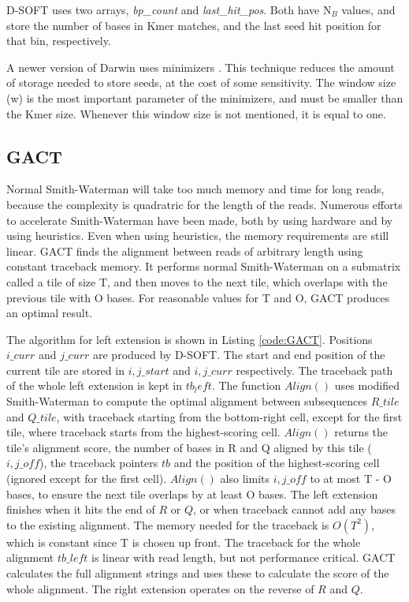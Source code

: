 \documentclass[../main/thesis.tex]{subfiles}
\begin{document}
D-SOFT uses two arrays, \textit{bp\_count} and \textit{last\_hit\_pos}.
Both have N$_{B}$ values, and store the number of bases in Kmer matches, and the last seed hit position for that bin, respectively.

A newer version of Darwin uses minimizers \cite{minimizers}.
This technique reduces the amount of storage needed to store seeds, at the cost of some sensitivity.
The window size (w) is the most important parameter of the minimizers, and must be smaller than the Kmer size.
Whenever this window size is not mentioned, it is equal to one.

\subsection{GACT}
Normal Smith-Waterman will take too much memory and time for long reads, because the complexity is quadratric for the length of the reads.
Numerous efforts to accelerate Smith-Waterman have been made, both by using hardware and by using heuristics.
Even when using heuristics, the memory requirements are still linear.
GACT finds the alignment between reads of arbitrary length using constant traceback memory.
It performs normal Smith-Waterman on a submatrix called a tile of size T, and then moves to the next tile, which overlaps with the previous tile with O bases.
For reasonable values for T and O, GACT produces an optimal result.

The algorithm for left extension is shown in Listing \ref{code:GACT}.
Positions $i\_curr$ and $j\_curr$ are produced by D-SOFT.
The start and end position of the current tile are stored in $i,j\_start$ and $i,j\_curr$ respectively.
The traceback path of the whole left extension is kept in $tb_left$.
The function $Align()$ uses modified Smith-Waterman to compute the optimal alignment between subsequences $R\_tile$ and $Q\_tile$, with traceback starting from the bottom-right cell, except for the first tile, where traceback starts from the highest-scoring cell.
$Align()$ returns the tile's alignment score, the number of bases in R and Q aligned by this tile ($i,j\_off$), the traceback pointers $tb$ and the position of the highest-scoring cell (ignored except for the first cell).
$Align()$ also limits $i,j\_off$ to at most T - O bases, to ensure the next tile overlaps by at least O bases.
The left extension finishes when it hits the end of $R$ or $Q$, or when traceback cannot add any bases to the existing alignment.
The memory needed for the traceback is $O(T^2)$, which is constant since T is chosen up front.
The traceback for the whole alignment $tb\_left$ is linear with read length, but not performance critical.
GACT calculates the full alignment strings and uses these to calculate the score of the whole alignment.
The right extension operates on the reverse of $R$ and $Q$.
\end{document}
